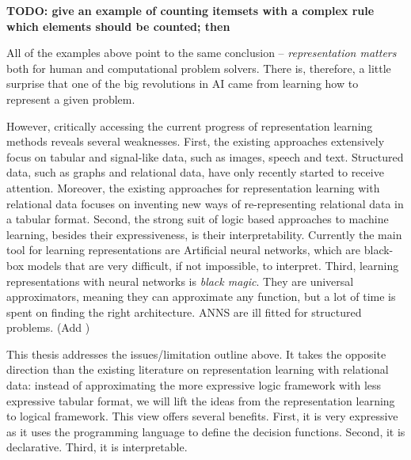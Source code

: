 
\textbf{TODO: give an example of counting itemsets with a complex rule which elements should be counted; then  }


All of the examples above point to the same conclusion -- \textit{representation matters} both for human and computational problem solvers.
There is, therefore, a little surprise that one of the big revolutions in AI came from learning how to represent a given problem.



However, critically accessing the current progress of representation learning methods reveals several weaknesses.
First, the existing approaches extensively focus on tabular and signal-like data, such as images, speech and text.
Structured data, such as graphs and relational data, have only recently started to receive attention.
Moreover, the existing approaches for representation learning with relational data focuses on inventing new ways of re-representing relational data in a tabular format.
Second, the strong suit of logic based approaches to machine learning, besides their expressiveness, is their interpretability.
Currently the main tool for learning representations are Artificial neural networks, which are black-box models that are very difficult, if not impossible, to interpret.
Third, learning representations with neural networks is \textit{black magic}.
They are universal approximators, meaning they can approximate any function, but a lot of time is spent on finding the right architecture.
ANNS are ill fitted for structured problems. (Add )





This thesis addresses the issues/limitation outline above.
It takes the opposite direction than the existing literature on representation learning with relational data: instead of approximating the more expressive logic framework with less expressive tabular format, we will lift the ideas from the representation learning to logical framework.
This view offers several benefits.
First, it is very expressive as it uses the programming language to define the decision functions.
Second, it is declarative.
Third, it is interpretable.



